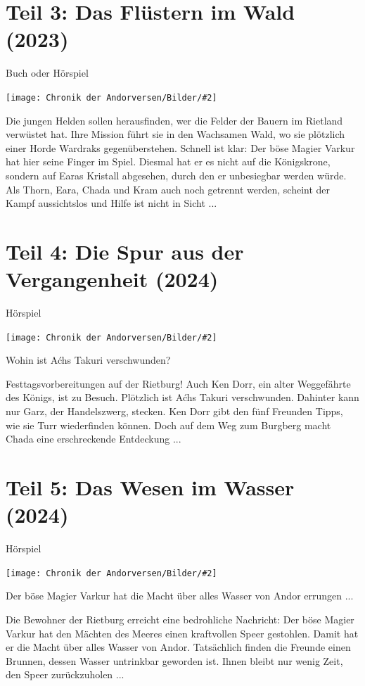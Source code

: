 \documentclass[10pt, a4paper, oneside]{book}
\newcommand{\fillbreak}{\vspace*{\fill}\columnbreak}
\newcommand{\produkt}[1]{%
    \section{#1}%
    \label{Produkt: #1}%
}
\newcommand{\bildmitts}[2][height=0.32\textwidth,width=0.48\textwidth,keepaspectratio]{%
    \begin{center}
        \texttt{[image: Chronik der Andorversen/Bilder/\#2]}
    \end{center}
}
\begin{document}
\begin{multicols}{2}
\produkt{Teil 3: Das Flüstern im Wald (2023)}

\begin{center}
    Buch oder Hörspiel
\end{center}

\bildmitts{Das Flüstern im Wald (2023).png}

Die jungen Helden sollen herausfinden, wer die Felder der Bauern im Rietland verwüstet hat. Ihre Mission führt sie in den Wachsamen Wald, wo sie plötzlich einer Horde Wardraks gegenüberstehen. Schnell ist klar: Der böse Magier Varkur hat hier seine Finger im Spiel. Diesmal hat er es nicht auf die Königskrone, sondern auf Earas Kristall abgesehen, durch den er unbesiegbar werden würde. Als Thorn, Eara, Chada und Kram auch noch getrennt werden, scheint der Kampf aussichtslos und Hilfe ist nicht in Sicht ...




\fillbreak
\produkt{Teil 4: Die Spur aus der Vergangenheit (2024)}

\begin{center}
    Hörspiel
\end{center}

\bildmitts{Die Spur aus der Vergangenheit (2024).jpeg}

Wohin ist Aćhs Takuri verschwunden?

Festtagsvorbereitungen auf der Rietburg! Auch Ken Dorr, ein alter Weggefährte des Königs, ist zu Besuch. Plötzlich ist Aćhs Takuri verschwunden. Dahinter kann nur Garz, der Handelszwerg, stecken. Ken Dorr gibt den fünf Freunden Tipps, wie sie Turr wiederfinden können. Doch auf dem Weg zum Burgberg macht Chada eine erschreckende Entdeckung ...





\produkt{Teil 5: Das Wesen im Wasser (2024)}

\begin{center}
    Hörspiel
\end{center}

\bildmitts{Das Wesen im Wasser (2024).jpeg}

Der böse Magier Varkur hat die Macht über alles Wasser von Andor errungen ...

Die Bewohner der Rietburg erreicht eine bedrohliche Nachricht: Der böse Magier Varkur hat den Mächten des Meeres einen kraftvollen Speer gestohlen. Damit hat er die Macht über alles Wasser von Andor. Tatsächlich finden die Freunde einen Brunnen, dessen Wasser untrinkbar geworden ist. Ihnen bleibt nur wenig Zeit, den Speer zurückzuholen ...








\end{multicols}
\end{document}
